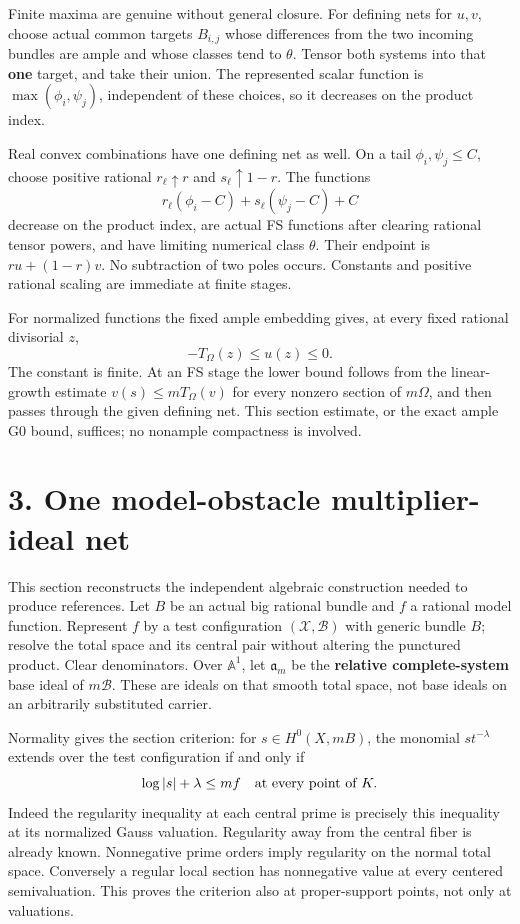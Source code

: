 \documentclass[
  10pt,
]{article}
\begin{document}
Finite maxima are genuine without general closure. For defining nets for
\(u,v\), choose actual common targets \(B_{i,j}\) whose differences from
the two incoming bundles are ample and whose classes tend to \(\theta\).
Tensor both systems into that \textbf{one} target, and take their union.
The represented scalar function is \(\max(\phi_i,\psi_j)\), independent
of these choices, so it decreases on the product index.

Real convex combinations have one defining net as well. On a tail
\(\phi_i,\psi_j\leq C\), choose positive rational \(r_\ell\uparrow r\)
and \(s_\ell\uparrow1-r\). The functions
\[r_\ell(\phi_i-C)+s_\ell(\psi_j-C)+C\] decrease on the product index,
are actual FS functions after clearing rational tensor powers, and have
limiting numerical class \(\theta\). Their endpoint is \(ru+(1-r)v\). No
subtraction of two poles occurs. Constants and positive rational scaling
are immediate at finite stages.

For normalized functions the fixed ample embedding gives, at every fixed
rational divisorial \(z\), \[-T_\Omega(z)\leq u(z)\leq0.\] The constant
is finite. At an FS stage the lower bound follows from the linear-growth
estimate \(v(s)\leq mT_\Omega(v)\) for every nonzero section of
\(m\Omega\), and then passes through the given defining net. This
section estimate, or the exact ample G0 bound, suffices; no nonample
compactness is involved.

\section{3. One model-obstacle multiplier-ideal
net}\label{one-model-obstacle-multiplier-ideal-net}

This section reconstructs the independent algebraic construction needed
to produce references. Let \(B\) be an actual big rational bundle and
\(f\) a rational model function. Represent \(f\) by a test configuration
\((\mathcal X,\mathcal B)\) with generic bundle \(B\); resolve the total
space and its central pair without altering the punctured product. Clear
denominators. Over \(\mathbb A^1\), let \(\mathfrak a_m\) be the
\textbf{relative complete-system} base ideal of \(m\mathcal B\). These
are ideals on that smooth total space, not base ideals on an arbitrarily
substituted carrier.

Normality gives the section criterion: for \(s\in H^0(X,mB)\), the
monomial \(s t^{-\lambda}\) extends over the test configuration if and
only if \[\log|s|+\lambda\leq m f\quad\hbox{at every point of }K.\]
Indeed the regularity inequality at each central prime is precisely this
inequality at its normalized Gauss valuation. Regularity away from the
central fiber is already known. Nonnegative prime orders imply
regularity on the normal total space. Conversely a regular local section
has nonnegative value at every centered semivaluation. This proves the
criterion also at proper-support points, not only at valuations.
\end{document}
